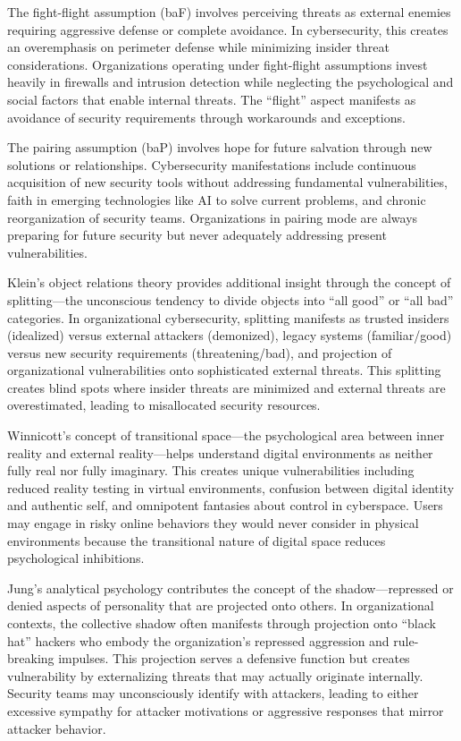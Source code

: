 \documentclass[11pt,a4paper]{article}
\begin{document}
The fight-flight assumption (baF) involves perceiving threats as external enemies requiring aggressive defense or complete avoidance. In cybersecurity, this creates an overemphasis on perimeter defense while minimizing insider threat considerations. Organizations operating under fight-flight assumptions invest heavily in firewalls and intrusion detection while neglecting the psychological and social factors that enable internal threats. The ``flight'' aspect manifests as avoidance of security requirements through workarounds and exceptions.

The pairing assumption (baP) involves hope for future salvation through new solutions or relationships. Cybersecurity manifestations include continuous acquisition of new security tools without addressing fundamental vulnerabilities, faith in emerging technologies like AI to solve current problems, and chronic reorganization of security teams. Organizations in pairing mode are always preparing for future security but never adequately addressing present vulnerabilities.

Klein's object relations theory provides additional insight through the concept of splitting—the unconscious tendency to divide objects into ``all good'' or ``all bad'' categories\cite{klein1946}. In organizational cybersecurity, splitting manifests as trusted insiders (idealized) versus external attackers (demonized), legacy systems (familiar/good) versus new security requirements (threatening/bad), and projection of organizational vulnerabilities onto sophisticated external threats. This splitting creates blind spots where insider threats are minimized and external threats are overestimated, leading to misallocated security resources.

Winnicott's concept of transitional space—the psychological area between inner reality and external reality—helps understand digital environments as neither fully real nor fully imaginary\cite{winnicott1971}. This creates unique vulnerabilities including reduced reality testing in virtual environments, confusion between digital identity and authentic self, and omnipotent fantasies about control in cyberspace. Users may engage in risky online behaviors they would never consider in physical environments because the transitional nature of digital space reduces psychological inhibitions.

Jung's analytical psychology contributes the concept of the shadow—repressed or denied aspects of personality that are projected onto others\cite{jung1969}. In organizational contexts, the collective shadow often manifests through projection onto ``black hat'' hackers who embody the organization's repressed aggression and rule-breaking impulses. This projection serves a defensive function but creates vulnerability by externalizing threats that may actually originate internally. Security teams may unconsciously identify with attackers, leading to either excessive sympathy for attacker motivations or aggressive responses that mirror attacker behavior.
\end{document}
